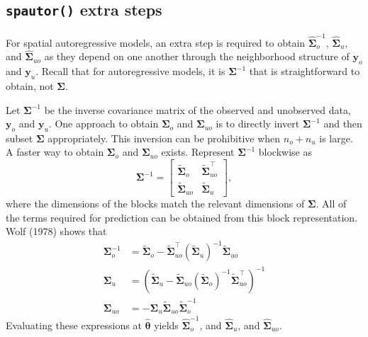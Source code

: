 \documentclass{article}
\begin{document}
\hypertarget{spautor-extra-steps}{%
\subsection{\texorpdfstring{\texttt{spautor()} extra
steps}{spautor() extra steps}}\label{spautor-extra-steps}}

For spatial autoregressive models, an extra step is required to obtain
\(\hat{\boldsymbol{\Sigma}}^{-1}_o\), \(\hat{\boldsymbol{\Sigma}}_u\),
and \(\hat{\boldsymbol{\Sigma}}_{uo}\) as they depend on one another
through the neighborhood structure of \(\mathbf{y}_o\) and
\(\mathbf{y}_u\). Recall that for autoregressive models, it is
\(\boldsymbol{\Sigma}^{-1}\) that is straightforward to obtain, not
\(\boldsymbol{\Sigma}\).

Let \(\boldsymbol{\Sigma}^{-1}\) be the inverse covariance matrix of the
observed and unobserved data, \(\mathbf{y}_o\) and \(\mathbf{y}_u\). One
approach to obtain \(\boldsymbol{\Sigma}_o\) and
\(\boldsymbol{\Sigma}_{uo}\) is to directly invert
\(\boldsymbol{\Sigma}^{-1}\) and then subset \(\boldsymbol{\Sigma}\)
appropriately. This inversion can be prohibitive when \(n_o + n_u\) is
large. A faster way to obtain \(\boldsymbol{\Sigma}_o\) and
\(\boldsymbol{\Sigma}_{uo}\) exists. Represent
\(\boldsymbol{\Sigma}^{-1}\) blockwise as
\begin{equation*}\label{eq:auto_hw}
  \boldsymbol{\Sigma}^{-1} =
  \begin{bmatrix}
    \tilde{\boldsymbol{\Sigma}}_{o} & \tilde{\boldsymbol{\Sigma}}^{\top}_{uo} \\
    \tilde{\boldsymbol{\Sigma}}_{uo} & \tilde{\boldsymbol{\Sigma}}_{u}
  \end{bmatrix},
\end{equation*} where the dimensions of the blocks match the relevant
dimensions of \(\boldsymbol{\Sigma}\). All of the terms required for
prediction can be obtained from this block representation. Wolf (1978)
shows that \begin{equation*}\label{eq:hw_forms}
  \begin{split}
    \boldsymbol{\Sigma}^{-1}_o & = \tilde{\boldsymbol{\Sigma}}_{o} - \tilde{\boldsymbol{\Sigma}}^{ \top}_{uo} (\tilde{\boldsymbol{\Sigma}}_{u})^{-1} \tilde{\boldsymbol{\Sigma}}_{uo} \\
    \boldsymbol{\Sigma}_u & = (\tilde{\boldsymbol{\Sigma}}_{u} - \tilde{\boldsymbol{\Sigma}}_{uo} (\tilde{\boldsymbol{\Sigma}}_{o})^{-1} \tilde{\boldsymbol{\Sigma}}^\top_{uo})^{-1} \\
    \boldsymbol{\Sigma}_{uo} & = - \boldsymbol{\Sigma}_u \tilde{\boldsymbol{\Sigma}}_{uo} \tilde{\boldsymbol{\Sigma}}^{-1}_{o}
  \end{split}
\end{equation*} Evaluating these expressions at
\(\hat{\boldsymbol{\theta}}\) yields
\(\hat{\boldsymbol{\Sigma}}^{-1}_o\), and
\(\hat{\boldsymbol{\Sigma}}_u\), and \(\hat{\boldsymbol{\Sigma}}_{uo}\).
\end{document}
